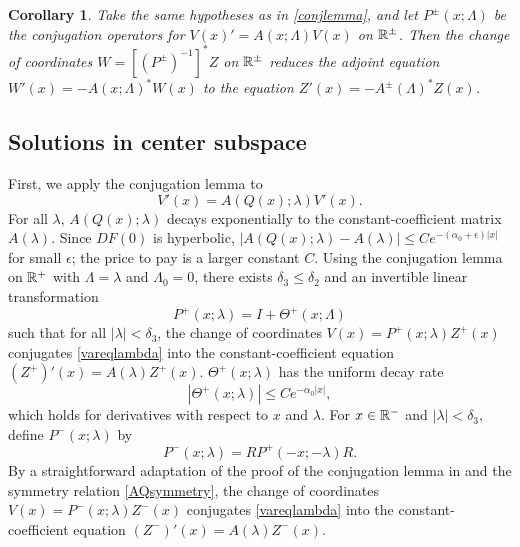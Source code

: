 \documentclass[10pt,reqno]{amsart}
\theoremstyle{plain}
\newtheorem{corollary}[theorem]{Corollary}
\theoremstyle{definition}
\theoremstyle{remark}
\numberwithin{theorem}{section}
\numberwithin{equation}{section}
\begin{document}
\begin{corollary}\label{corr:adjconj}
Take the same hypotheses as in \cref{conjlemma}, and let $P^\pm(x; \Lambda)$ be the conjugation operators for $V(x)' = A(x; \Lambda) V(x)$ on $\mathbb{R}^\pm$. Then the change of coordinates $W = [(P^\pm)^{-1}]^* Z$ on $\mathbb{R}^\pm$ reduces the adjoint equation $W'(x) = -A(x; \Lambda)^* W(x)$ to the equation $Z'(x) = -A^\pm(\Lambda)^* Z(x)$.
\end{corollary}

\subsection{Solutions in center subspace}\label{sec:conjvareq}

First, we apply the conjugation lemma to
\begin{equation}\label{vareqlambda}
V'(x) = A(Q(x); \lambda) V'(x).
\end{equation}
For all $\lambda$, $A(Q(x); \lambda)$ decays exponentially to the constant-coefficient matrix $A(\lambda)$. Since $DF(0)$ is hyperbolic, $|A(Q(x); \lambda) - A(\lambda)| \leq C e^{-(\alpha_0 + \epsilon) |x|}$ for small $\epsilon$; the price to pay is a larger constant $C$. Using the conjugation lemma on $\mathbb{R}^+$ with $\Lambda = \lambda$ and $\Lambda_0 = 0$, there exists $\delta_3 \leq \delta_2$ and an invertible linear transformation 
\begin{equation}\label{defPplus}
P^+(x; \lambda) = I + \Theta^+(x; \Lambda)
\end{equation}
such that for all $|\lambda| < \delta_3$, the change of coordinates $V(x) = P^+(x; \lambda) Z^+(x)$ conjugates \cref{vareqlambda} into the constant-coefficient equation $(Z^+)'(x) = A(\lambda) Z^+(x)$. $\Theta^+(x; \lambda)$ has the uniform decay rate
\begin{equation}\label{Thetadecay}
|\Theta^+(x; \lambda)| \leq C e^{-\alpha_0 |x|},
\end{equation}
which holds for derivatives with respect to $x$ and $\lambda$. For $x \in \mathbb{R}^-$ and $|\lambda| < \delta_3$, define $P^-(x; \lambda)$ by
\begin{equation}\label{defPminus}
P^-(x; \lambda) = RP^+(-x; -\lambda)R.
\end{equation}
By a straightforward adaptation of the proof of the conjugation lemma in \cite{Zumbrun2009} and the symmetry relation \cref{AQsymmetry}, the change of coordinates $V(x) = P^-(x; \lambda) Z^-(x)$ conjugates \cref{vareqlambda} into the constant-coefficient equation $(Z^-)'(x) = A(\lambda) Z^-(x)$.
\end{document}
